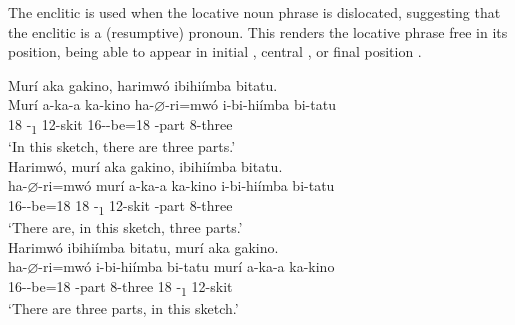 \documentclass[output=paper]{langscibook}
\begin{document}
\z

The enclitic is used when the locative noun phrase is dislocated, suggesting that the enclitic is a (resumptive) pronoun. This renders the locative phrase free in its position, being able to appear in initial , central , or final position .\pagebreak

\ea
\label{bkm:Ref105422954}\citep[134]{Nshemezimana2016}
\ea
\label{bkm:Ref105422954:a}
Murí aka gakino, harimwó ibihiímba bitatu.\\
\gll
Murí  a-ka-a  ka-kino  ha-$\varnothing$-ri=mwó   i-bi-hiímba  bi-tatu \\
18  -\DEM{}\textsubscript{1}  12-skit  16\SM-\PRS-{}be=18   -{}part  8-three \\
\glt
  ‘In this sketch, there are three parts.’\\

  
\ex
\label{bkm:Ref105422954:b}
Harimwó, murí aka gakino, ibihiímba bitatu.\\
\gll
ha-$\varnothing$-ri=mwó  murí  a-ka-a  ka-kino   i-bi-hiímba  bi-tatu \\
16\SM-\PRS-{}be=18  18  -\DEM\textsubscript{1}  12-skit   -{}part  8-three \\
\glt
  ‘There are, in this sketch, three parts.’\\

\ex
\label{bkm:Ref105422954:c}
Harimwó ibihiímba bitatu, murí aka gakino.\\
\gll
ha-$\varnothing$-ri=mwó  i-bi-hiímba  bi-tatu  murí  a-ka-a  ka-kino\\
16\SM-\PRS-{}be=18  -part  8-three  18  -\DEM\textsubscript{1}  12-skit\\
\glt
‘There are three parts, in this sketch.’\\

\z\z
\end{document}
